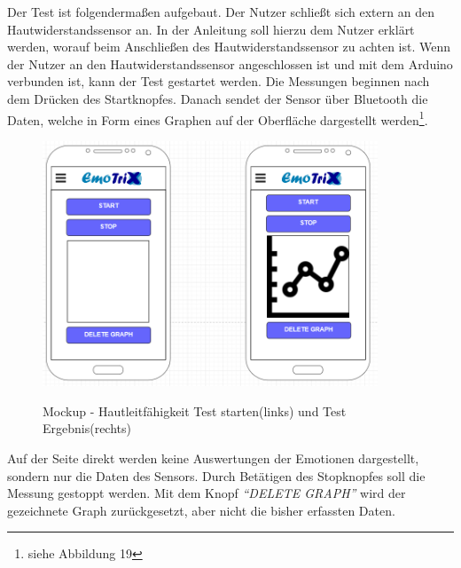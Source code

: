 Der Test ist folgendermaßen aufgebaut. Der Nutzer schließt sich extern an den Hautwiderstandssensor an. In der Anleitung soll hierzu dem Nutzer erklärt werden, worauf beim Anschließen des Hautwiderstandssensor zu achten ist. Wenn der Nutzer an den Hautwiderstandssensor angeschlossen ist und mit dem Arduino verbunden ist, kann der Test gestartet werden. Die Messungen beginnen nach dem Drücken des Startknopfes. Danach sendet der Sensor über Bluetooth die Daten, welche in Form eines Graphen auf der Oberfläche dargestellt werden\footnote{siehe Abbildung 19}. 
\begin{figure}[h]
	\centering
	\includegraphics[width=10cm]{Bilder/Mockup-GSR.png}
	\label{img:Mockup-GSR}
	\caption[Mockup - Hautleitfähigkeit Test starten(links) und Test Ergebnis(rechts)]{Mockup - Hautleitfähigkeit Test starten(links) und Test Ergebnis(rechts)}
\end{figure}\newline
Auf der Seite direkt werden keine Auswertungen der Emotionen dargestellt, sondern nur die Daten des Sensors. Durch Betätigen des Stopknopfes soll die Messung gestoppt werden. Mit dem Knopf \textit{``DELETE GRAPH''} wird der gezeichnete Graph zurückgesetzt, aber nicht die bisher erfassten Daten.
\newline \newline \newline\newline \newline \newline
